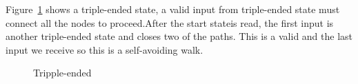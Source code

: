 Figure~\ref{fig:triple-ended} shows a triple-ended state, a valid input from triple-ended state must connect all the nodes to proceed.After the start stateis read, the first input is another triple-ended state and closes two of the paths. This is a valid and the last input we receive so this is a self-avoiding walk.
\begin{figure}[h!]
\begin{center}
\end{center}
\caption{Tripple-ended}
\label{fig:triple-ended}
\end{figure}
